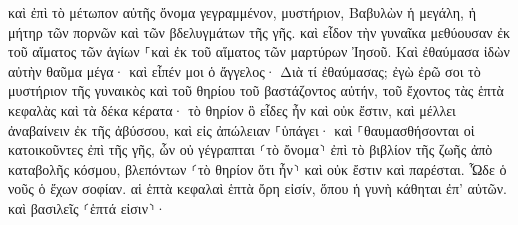\documentclass{openreader}
\begin{document}
καὶ ἐπὶ τὸ μέτωπον αὐτῆς ὄνομα γεγραμμένον, μυστήριον, Βαβυλὼν ἡ μεγάλη, ἡ μήτηρ τῶν πορνῶν καὶ τῶν βδελυγμάτων τῆς γῆς. 
καὶ εἶδον τὴν γυναῖκα μεθύουσαν ἐκ τοῦ αἵματος τῶν ἁγίων ⸀καὶ ἐκ τοῦ αἵματος τῶν μαρτύρων Ἰησοῦ. Καὶ ἐθαύμασα ἰδὼν αὐτὴν θαῦμα μέγα· 
καὶ εἶπέν μοι ὁ ἄγγελος· Διὰ τί ἐθαύμασας; ἐγὼ ἐρῶ σοι τὸ μυστήριον τῆς γυναικὸς καὶ τοῦ θηρίου τοῦ βαστάζοντος αὐτήν, τοῦ ἔχοντος τὰς ἑπτὰ κεφαλὰς καὶ τὰ δέκα κέρατα· 
τὸ θηρίον ὃ εἶδες ἦν καὶ οὐκ ἔστιν, καὶ μέλλει ἀναβαίνειν ἐκ τῆς ἀβύσσου, καὶ εἰς ἀπώλειαν ⸀ὑπάγει· καὶ ⸀θαυμασθήσονται οἱ κατοικοῦντες ἐπὶ τῆς γῆς, ὧν οὐ γέγραπται ⸂τὸ ὄνομα⸃ ἐπὶ τὸ βιβλίον τῆς ζωῆς ἀπὸ καταβολῆς κόσμου, βλεπόντων ⸂τὸ θηρίον ὅτι ἦν⸃ καὶ οὐκ ἔστιν καὶ παρέσται. 
Ὧδε ὁ νοῦς ὁ ἔχων σοφίαν. αἱ ἑπτὰ κεφαλαὶ ἑπτὰ ὄρη εἰσίν, ὅπου ἡ γυνὴ κάθηται ἐπ’ αὐτῶν. καὶ βασιλεῖς ⸂ἑπτά εἰσιν⸃· 
\end{document}
